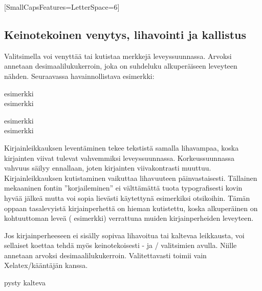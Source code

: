 \begin{koodilohkosis}
\setmainfont{…}[SmallCapsFeatures={LetterSpace=6}]
\end{koodilohkosis}

\subsection{Keinotekoinen venytys, lihavointi ja kallistus}
\label{luku:fontit_venytys}

Valitsimella  voi venyttää tai kutistaa merkkejä
leveyssuunnassa. Arvoksi annetaan desimaalilukukerroin, joka on
suhdeluku alkuperäiseen leveyteen nähden. Seuraavassa havainnollistava
esimerkki:

\begin{koodilohkosis}
esimerkki \\
{ esimerkki}
\end{koodilohkosis}

\begin{tulossis}
  esimerkki \\
  { esimerkki}
\end{tulossis}

Kirjainleikkauksen leventäminen tekee tekstistä samalla lihavampaa,
koska kirjainten viivat tulevat vahvemmiksi leveyssuunnassa.
Korkeussuunnassa vahvuus säilyy ennallaan, joten kirjainten
viivakontrasti muuttuu. Kirjainleikkauksen kutistaminen vaikuttaa
lihavuuteen päinvastaisesti. Tällainen mekaaninen fontin
''korjaileminen'' ei välttämättä tuota typografisesti kovin hyvää jälkeä
mutta voi sopia lievästi käytettynä esimerkiksi otsikoihin. Tämän oppaan
tasalevyistä kirjainperhettä on hieman kutistettu, koska alkuperäinen on
kohtuuttoman leveä ({\ttfamily{}
  esimerkki}) verrattuna muiden kirjainperheiden leveyteen.

Jos kirjainperheeseen ei sisälly sopivaa lihavoitua tai kaltevaa
leikkausta, voi sellaiset koettaa tehdä myös keinotekoisesti
- ja \-/ valitsimien avulla.
Niille annetaan arvoksi desimaalilukukerroin. Valitettavasti
 toimii vain Xelatex\-/kääntäjän kanssa.

\begin{koodilohkosis}
pysty { kalteva}
\end{koodilohkosis}

